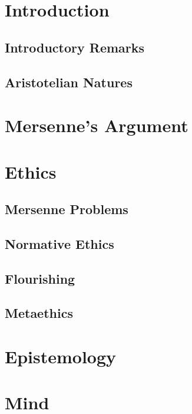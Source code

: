 \def\mychapter{I}

\chapter{Introduction}\label{ch:intro}
\section{Introductory Remarks}
\section{Aristotelian Natures}
\chaptertail 

\def\mychapter{II}

\chapter{Mersenne's Argument}\label{ch:Mersenne}
\chaptertail 

\def\mychapter{II}

\chapter{Ethics}\label{ch:intro}
\section{Mersenne Problems}
\section{Normative Ethics}
\section{Flourishing}
\section{Metaethics}
\chaptertail 

\def\mychapter{III}

\chapter{Epistemology}\label{ch:epistemology}
\chaptertail 

\def\mychapter{IV}

\chapter{Mind}\label{ch:mind}
\chaptertail 

\def\mychapter{V}

